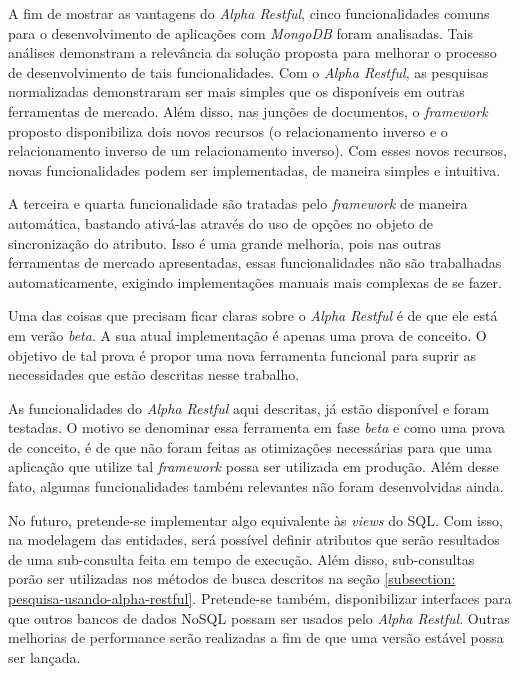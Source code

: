 A fim de mostrar as vantagens do \textit{Alpha Restful}, cinco funcionalidades comuns para o desenvolvimento de aplicações com \textit{MongoDB} foram analisadas. Tais análises demonstram a relevância da solução proposta para melhorar o processo de desenvolvimento de tais funcionalidades. Com o \textit{Alpha Restful}, as pesquisas normalizadas demonstraram ser mais simples que os disponíveis em outras ferramentas de mercado. Além disso, nas junções de documentos, o \textit{framework} proposto disponibiliza dois novos recursos (o relacionamento inverso e o relacionamento inverso de um relacionamento inverso). Com esses novos recursos, novas funcionalidades podem ser implementadas, de maneira simples e intuitiva.

A terceira e quarta funcionalidade são tratadas pelo \textit{framework} de maneira automática, bastando ativá-las através do uso de opções no objeto de sincronização do atributo. Isso é uma grande melhoria, pois nas outras ferramentas de mercado apresentadas, essas funcionalidades não são trabalhadas automaticamente, exigindo implementações manuais mais complexas de se fazer.

Uma das coisas que precisam ficar claras sobre o \textit{Alpha Restful} é de que ele está em verão \textit{beta}. A sua atual implementação é apenas uma prova de conceito. O objetivo de tal prova é propor uma nova ferramenta funcional para suprir as necessidades que estão descritas nesse trabalho.

As funcionalidades do \textit{Alpha Restful} aqui descritas, já estão disponível e foram testadas. O motivo se denominar essa ferramenta em fase \textit{beta} e como uma prova de conceito, é de que não foram feitas as otimizações necessárias para que uma aplicação que utilize tal \textit{framework} possa ser utilizada em produção. Além desse fato, algumas funcionalidades também relevantes não foram desenvolvidas ainda.

No futuro, pretende-se implementar algo equivalente às \textit{views} do SQL. Com isso, na modelagem das entidades, será possível definir atributos que serão resultados de uma sub-consulta feita em tempo de execução. Além disso, sub-consultas porão ser utilizadas nos métodos de busca descritos na seção \ref{subsection: pesquisa-usando-alpha-restful}. Pretende-se também, disponibilizar interfaces para que outros bancos de dados NoSQL possam ser usados pelo \textit{Alpha Restful}. Outras melhorias de performance serão realizadas a fim de que uma versão estável possa ser lançada.

